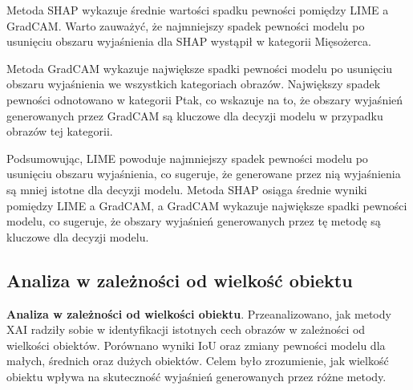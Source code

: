 Metoda SHAP wykazuje średnie wartości spadku pewności pomiędzy LIME a GradCAM.
Warto zauważyć, że najmniejszy spadek pewności modelu po usunięciu obszaru wyjaśnienia dla SHAP wystąpił w kategorii Mięsożerca.

Metoda GradCAM wykazuje największe spadki pewności modelu po usunięciu obszaru wyjaśnienia we wszystkich kategoriach obrazów.
Największy spadek pewności odnotowano w kategorii Ptak, co wskazuje na to, że obszary wyjaśnień generowanych przez GradCAM są kluczowe dla decyzji modelu w przypadku obrazów tej kategorii.

Podsumowując, LIME powoduje najmniejszy spadek pewności modelu po usunięciu obszaru wyjaśnienia, co sugeruje, że generowane przez nią wyjaśnienia są mniej istotne dla decyzji modelu.
Metoda SHAP osiąga średnie wyniki pomiędzy LIME a GradCAM, a GradCAM wykazuje największe spadki pewności modelu, co sugeruje, że obszary wyjaśnień generowanych przez tę metodę są kluczowe dla decyzji modelu.

\subsection*{Analiza w zależności od wielkość obiektu}

\textbf{Analiza w zależności od wielkości obiektu}.
Przeanalizowano, jak metody XAI radziły sobie w identyfikacji istotnych cech obrazów w zależności od wielkości obiektów.
Porównano wyniki IoU oraz zmiany pewności modelu dla małych, średnich oraz dużych obiektów.
Celem było zrozumienie, jak wielkość obiektu wpływa na skuteczność wyjaśnień generowanych przez różne metody.


